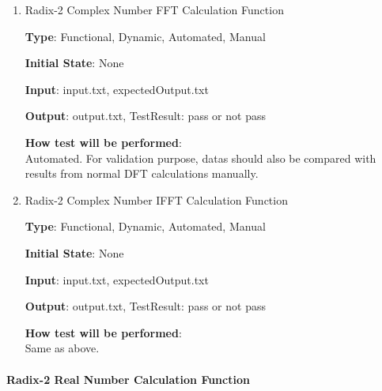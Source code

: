 \documentclass[12pt, titlepage]{article}
\begin{document}
\begin{enumerate}

\item{Radix-2 Complex Number FFT Calculation Function\\}

\textbf {Type}: Functional, Dynamic, Automated, Manual
					
\textbf {Initial State}: None
					
\textbf {Input}: input.txt, expectedOutput.txt
					
\textbf {Output}:  output.txt, TestResult: pass or not pass
					
\textbf {How test will be performed}: \\
Automated.
For validation purpose, datas should also be compared with results from normal DFT calculations manually.

\item{Radix-2 Complex Number IFFT Calculation Function\\}

\textbf {Type}: Functional, Dynamic, Automated, Manual
					
\textbf {Initial State}: None
					
\textbf {Input}: input.txt, expectedOutput.txt
					
\textbf {Output}:  output.txt, TestResult: pass or not pass

\textbf {How test will be performed}: \\
Same as above.
\end{enumerate}

					
\paragraph{Radix-2 Real Number Calculation Function\\}
\end{document}
